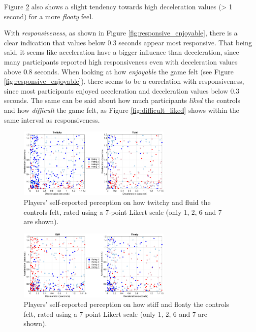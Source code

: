 Figure \ref{fig:stiff_floaty} also shows a slight tendency towards high deceleration values (> 1 second) for a more \textit{floaty} feel.

With \textit{responsiveness}, as shown in Figure \ref{fig:responsive_enjoyable}, there is a clear indication that values below 0.3 seconds appear most responsive. That being said, it seems like acceleration have a bigger influence than deceleration, since many participants reported high responsiveness even with deceleration values above 0.8 seconds. When looking at how \textit{enjoyable} the game felt (see Figure \ref{fig:responsive_enjoyable}), there seems to be a correlation with responsiveness, since most participants enjoyed acceleration and deceleration values below 0.3 seconds. The same can be said about how much participants \textit{liked} the controls and how \textit{difficult} the game felt, as Figure \ref{fig:difficult_liked} shows within the same interval as responsiveness.

\begin{figure}[htbp]
\centering
\includegraphics[width=0.67\textwidth]{Pics/Classes/twitchy_fluid}
\caption{Players' self-reported perception on how twitchy and fluid the controls felt, rated using a 7-point Likert scale (only 1, 2, 6 and 7 are shown).}
\label{fig:twitchyFluid}
\end{figure}

\begin{figure}[htbp]
\centering
\includegraphics[width=0.67\textwidth]{Pics/Classes/Stiff_floaty}
\caption{Players' self-reported perception on how stiff and floaty the controls felt, rated using a 7-point Likert scale (only 1, 2, 6 and 7 are shown).}
\label{fig:stiff_floaty}
\end{figure}

